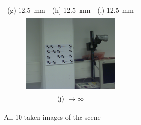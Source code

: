 \documentclass[
a4paper,     %
11pt         %
]{scrartcl}  %
\begin{document}
\begin{figure}[ht!]
\begin{tabular}{ccc}
(g) \SI{12.5}{mm} & (h) \SI{12.5}{mm} & (i) \SI{12.5}{mm}\\[6pt]
 \multicolumn{3}{c}{\includegraphics[width=48mm]{./Bildg_Messtechnik_Lab/CrossRatio/images/image_b5.png}} \\[6pt]
 \multicolumn{3}{c}{(j) $\rightarrow\infty$}
\end{tabular}
\caption{All 10 taken images of the scene}
\label{fig:cornermark_images}
\end{figure}



% 

% 
\end{document}
